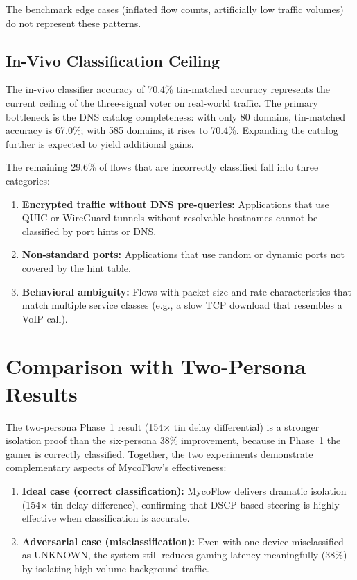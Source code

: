 The benchmark edge cases (inflated flow counts, artificially low traffic volumes) do not represent these patterns.

\subsection{In-Vivo Classification Ceiling}

The in-vivo classifier accuracy of 70.4\% tin-matched accuracy represents the current ceiling of the three-signal voter on real-world traffic. The primary bottleneck is the DNS catalog completeness: with only 80 domains, tin-matched accuracy is 67.0\%; with 585 domains, it rises to 70.4\%. Expanding the catalog further is expected to yield additional gains.

The remaining 29.6\% of flows that are incorrectly classified fall into three categories:
\begin{enumerate}
  \item \textbf{Encrypted traffic without DNS pre-queries:} Applications that use QUIC or WireGuard tunnels without resolvable hostnames cannot be classified by port hints or DNS.
  \item \textbf{Non-standard ports:} Applications that use random or dynamic ports not covered by the hint table.
  \item \textbf{Behavioral ambiguity:} Flows with packet size and rate characteristics that match multiple service classes (e.g., a slow TCP download that resembles a VoIP call).
\end{enumerate}

\section{Comparison with Two-Persona Results}

The two-persona Phase~1 result (154$\times$ tin delay differential) is a stronger isolation proof than the six-persona 38\% improvement, because in Phase~1 the gamer is correctly classified. Together, the two experiments demonstrate complementary aspects of MycoFlow's effectiveness:

\begin{enumerate}
  \item \textbf{Ideal case (correct classification):} MycoFlow delivers dramatic isolation (154$\times$ tin delay difference), confirming that DSCP-based steering is highly effective when classification is accurate.
  \item \textbf{Adversarial case (misclassification):} Even with one device misclassified as UNKNOWN, the system still reduces gaming latency meaningfully (38\%) by isolating high-volume background traffic.
\end{enumerate}

